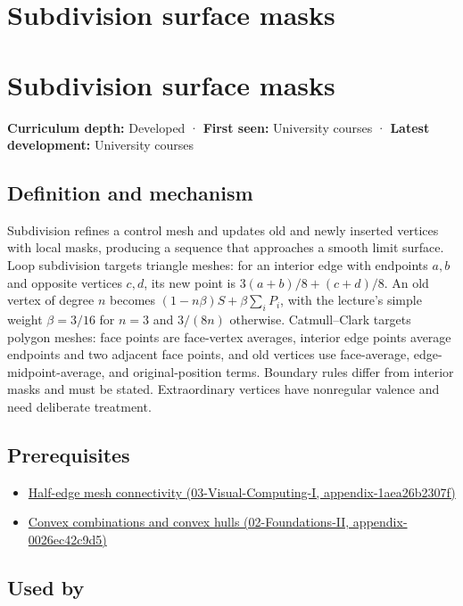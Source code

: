 \hypertarget{appendix-0234ab7f86b1}{}
\section*{Subdivision surface masks}
\section{Subdivision surface masks}\label{subdivision-surface-masks}

\textbf{Curriculum depth:} Developed · \textbf{First seen:} University courses · \textbf{Latest development:} University courses

\subsection{Definition and mechanism}\label{definition-and-mechanism}

Subdivision refines a control mesh and updates old and newly inserted vertices with local masks, producing a sequence that approaches a smooth limit surface. Loop subdivision targets triangle meshes: for an interior edge with endpoints \(a,b\) and opposite vertices \(c,d\), its new point is \(3(a+b)/8+(c+d)/8\). An old vertex of degree \(n\) becomes \((1-n\beta)S+\beta\sum_iP_i\), with the lecture's simple weight \(\beta=3/16\) for \(n=3\) and \(3/(8n)\) otherwise. Catmull--Clark targets polygon meshes: face points are face-vertex averages, interior edge points average endpoints and two adjacent face points, and old vertices use face-average, edge-midpoint-average, and original-position terms. Boundary rules differ from interior masks and must be stated. Extraordinary vertices have nonregular valence and need deliberate treatment.

\subsection{Prerequisites}\label{prerequisites}

\begin{itemize}
\tightlist
\item
  \href{}{Half-edge mesh connectivity (03-Visual-Computing-I, appendix-1aea26b2307f)}
\item
  \href{}{Convex combinations and convex hulls (02-Foundations-II, appendix-0026ec42c9d5)}
\end{itemize}

\subsection{Used by}\label{used-by}

